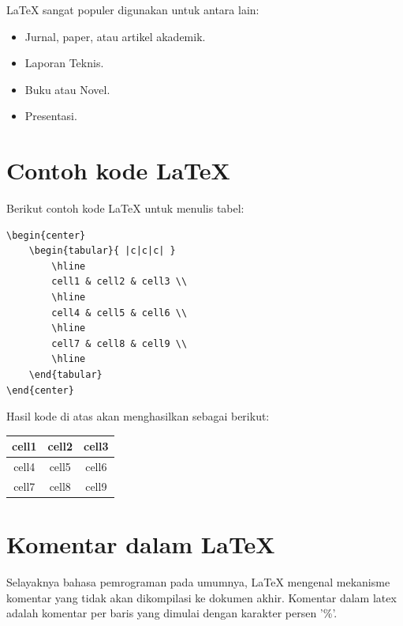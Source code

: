 \documentclass{book} %
\begin{document}
    LaTeX sangat populer digunakan untuk antara lain:
    \begin{itemize}
        \item Jurnal, paper, atau artikel akademik.
        \item Laporan Teknis.
        \item Buku atau Novel.
        \item Presentasi.
    \end{itemize}

    \section{Contoh kode LaTeX}

    Berikut contoh kode LaTeX untuk menulis tabel:

    \begin{verbatim}
\begin{center}
    \begin{tabular}{ |c|c|c| }
        \hline
        cell1 & cell2 & cell3 \\
        \hline
        cell4 & cell5 & cell6 \\
        \hline
        cell7 & cell8 & cell9 \\
        \hline
    \end{tabular}
\end{center}
    \end{verbatim}

    Hasil kode di atas akan menghasilkan sebagai berikut:
    \begin{center}
        \begin{tabular}{ |c|c|c| }
            \hline
            cell1 & cell2 & cell3 \\
            \hline
            cell4 & cell5 & cell6 \\
            \hline
            cell7 & cell8 & cell9 \\
            \hline
        \end{tabular}
    \end{center}

    \section{Komentar dalam LaTeX}

    Selayaknya bahasa pemrograman pada umumnya, LaTeX mengenal mekanisme komentar yang tidak akan dikompilasi ke dokumen akhir.
    Komentar dalam latex adalah komentar per baris yang dimulai dengan karakter persen '\%'.
\end{document}
